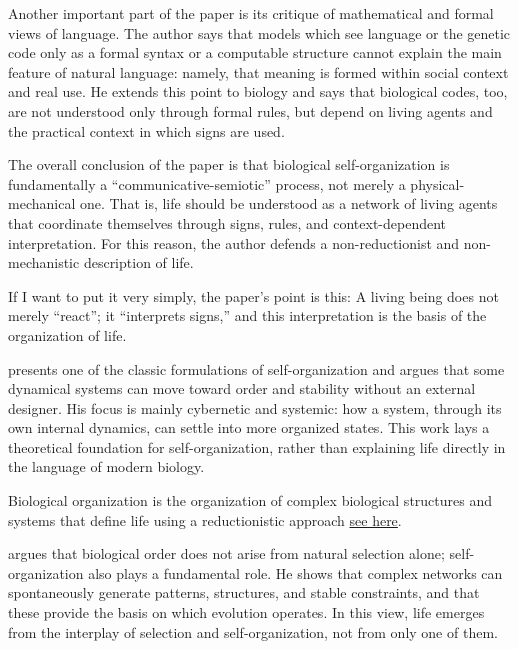 \documentclass{book}
\newcommand{\seehere}[1]{\href{#1}{see here}}
\providecommand{\seehere}[1]{\href{#1}{see here}}
\begin{document}
    Another important part of the paper is its critique of mathematical and formal views of language. The author says that models which see language or the genetic code only as a formal syntax or a computable structure cannot explain the main feature of natural language: namely, that meaning is formed within social context and real use. He extends this point to biology and says that biological codes, too, are not understood only through formal rules, but depend on living agents and the practical context in which signs are used.
    
    The overall conclusion of the paper is that biological self-organization is fundamentally a “communicative-semiotic” process, not merely a physical-mechanical one. That is, life should be understood as a network of living agents that coordinate themselves through signs, rules, and context-dependent interpretation. For this reason, the author defends a non-reductionist and non-mechanistic description of life.
    
    If I want to put it very simply, the paper’s point is this:
    A living being does not merely “react”; it “interprets signs,” and this interpretation is the basis of the organization of life.


\cite{ashby-1947-principles-of-the-self-organizing-dynamic-system} presents one of the classic formulations of self-organization and argues that some dynamical systems can move toward order and stability without an external designer.
    His focus is mainly cybernetic and systemic: how a system, through its own internal dynamics, can settle into more organized states.
    This work lays a theoretical foundation for self-organization, rather than explaining life directly in the language of modern biology.
    
    Biological organization is the organization of complex biological structures and systems that define life using a reductionistic approach \seehere{https://en.wikipedia.org/wiki/Biological_organisation}.
    
    
    
    \cite{kauffman-1993-the-origins-of-order-self-organization-and-selection-in-evolution} argues that biological order does not arise from natural selection alone; self-organization also plays a fundamental role.
    He shows that complex networks can spontaneously generate patterns, structures, and stable constraints, and that these provide the basis on which evolution operates.
    In this view, life emerges from the interplay of selection and self-organization, not from only one of them.
\end{document}
